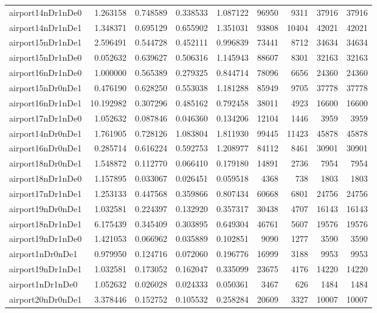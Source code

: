 \begin{longtable}{|l|r|r|r|r|r|r|r|r|}
airport14nDr1nDe0 & 1.263158 & 0.748589 & 0.338533 & 1.087122 & 96950 & 9311 & 37916 & 37916 \\
airport14nDr1nDe1 & 1.348371 & 0.695129 & 0.655902 & 1.351031 & 93808 & 10404 & 42021 & 42021 \\
airport15nDr1nDe1 & 2.596491 & 0.544728 & 0.452111 & 0.996839 & 73441 & 8712 & 34634 & 34634 \\
airport15nDr1nDe0 & 0.052632 & 0.639627 & 0.506316 & 1.145943 & 88607 & 8301 & 32163 & 32163 \\
airport16nDr1nDe0 & 1.000000 & 0.565389 & 0.279325 & 0.844714 & 78096 & 6656 & 24360 & 24360 \\
airport15nDr0nDe1 & 0.476190 & 0.628250 & 0.553038 & 1.181288 & 85949 & 9705 & 37778 & 37778 \\
airport16nDr1nDe1 & 10.192982 & 0.307296 & 0.485162 & 0.792458 & 38011 & 4923 & 16600 & 16600 \\
airport17nDr1nDe0 & 1.052632 & 0.087846 & 0.046360 & 0.134206 & 12104 & 1446 & 3959 & 3959 \\
airport14nDr0nDe1 & 1.761905 & 0.728126 & 1.083804 & 1.811930 & 99445 & 11423 & 45878 & 45878 \\
airport16nDr0nDe1 & 0.285714 & 0.616224 & 0.592753 & 1.208977 & 84112 & 8461 & 30901 & 30901 \\
airport18nDr0nDe1 & 1.548872 & 0.112770 & 0.066410 & 0.179180 & 14891 & 2736 & 7954 & 7954 \\
airport18nDr1nDe0 & 1.157895 & 0.033067 & 0.026451 & 0.059518 & 4368 & 738 & 1803 & 1803 \\
airport17nDr1nDe1 & 1.253133 & 0.447568 & 0.359866 & 0.807434 & 60668 & 6801 & 24756 & 24756 \\
airport19nDr0nDe1 & 1.032581 & 0.224397 & 0.132920 & 0.357317 & 30438 & 4707 & 16143 & 16143 \\
airport18nDr1nDe1 & 6.175439 & 0.345409 & 0.303895 & 0.649304 & 46761 & 5607 & 19576 & 19576 \\
airport19nDr1nDe0 & 1.421053 & 0.066962 & 0.035889 & 0.102851 & 9090 & 1277 & 3590 & 3590 \\
airport1nDr0nDe1 & 0.979950 & 0.124716 & 0.072060 & 0.196776 & 16999 & 3188 & 9953 & 9953 \\
airport19nDr1nDe1 & 1.032581 & 0.173052 & 0.162047 & 0.335099 & 23675 & 4176 & 14220 & 14220 \\
airport1nDr1nDe0 & 1.052632 & 0.026028 & 0.024333 & 0.050361 & 3467 & 626 & 1484 & 1484 \\
airport20nDr0nDe1 & 3.378446 & 0.152752 & 0.105532 & 0.258284 & 20609 & 3327 & 10007 & 10007 \\

\end{longtable}
